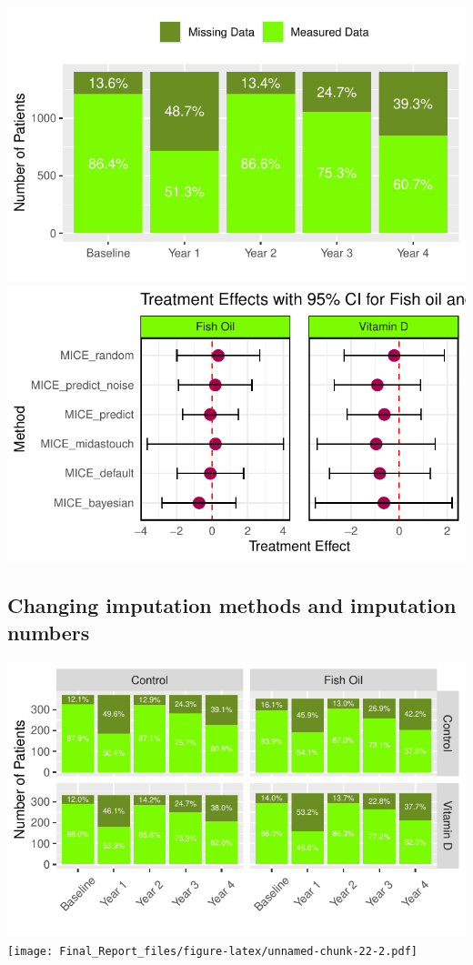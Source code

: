 \documentclass{article}
\begin{document}
\includegraphics{Final_Report_files/figure-latex/unnamed-chunk-21-1.pdf}
\includegraphics{Final_Report_files/figure-latex/unnamed-chunk-21-2.pdf}

\subsection{Changing imputation methods and imputation
numbers}\label{changing-imputation-methods-and-imputation-numbers}

\includegraphics{Final_Report_files/figure-latex/unnamed-chunk-22-1.pdf}
\texttt{[image: Final\_Report\_files/figure-latex/unnamed-chunk-22-2.pdf]}
\end{document}
